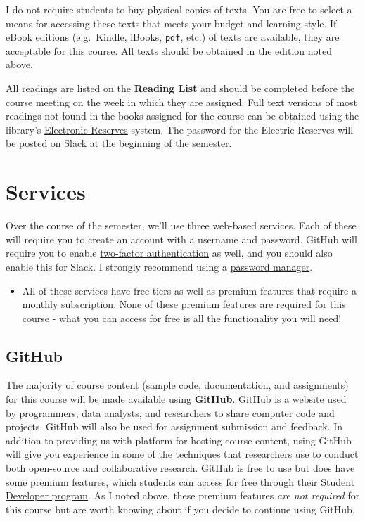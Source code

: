 \documentclass[]{book}
\newenvironment{rmdblock}[1]
  {\begin{shaded*}
  \begin{itemize}
  \renewcommand{\labelitemi}{
    \raisebox{-.7\height}[0pt][0pt]{
      {\setkeys{Gin}{width=3em,keepaspectratio}\texttt{[image: images/\#1]}}
    }
  }
  \item
  }
  {
  \end{itemize}
  \end{shaded*}
  }
\newenvironment{rmdwarning}
  {\begin{rmdblock}{warning}}
  {\end{rmdblock}}
\theoremstyle{definition}
\theoremstyle{definition}
\theoremstyle{definition}
\theoremstyle{remark}
\begin{document}
I do not require students to buy physical copies of texts. You are free
to select a means for accessing these texts that meets your budget and
learning style. If eBook editions (e.g.~Kindle, iBooks, \texttt{pdf},
etc.) of texts are available, they are acceptable for this course. All
texts should be obtained in the edition noted above.

All readings are listed on the \textbf{Reading List} and should be
completed before the course meeting on the week in which they are
assigned. Full text versions of most readings not found in the books
assigned for the course can be obtained using the library's
\href{http://eres.slu.edu/eres/coursepass.aspx?cid=4487}{Electronic
Reserves} system. The password for the Electric Reserves will be posted
on Slack at the beginning of the semester.

\hypertarget{services}{%
\section{Services}\label{services}}

Over the course of the semester, we'll use three web-based services.
Each of these will require you to create an account with a username and
password. GitHub will require you to enable
\href{https://en.wikipedia.org/wiki/Multi-factor_authentication}{two-factor
authentication} as well, and you should also enable this for Slack. I
strongly recommend using a
\href{https://lifehacker.com/5529133/five-best-password-managers}{password
manager}.

\begin{rmdwarning}
All of these services have free tiers as well as premium features that
require a monthly subscription. None of these premium features are
required for this course - what you can access for free is all the
functionality you will need!
\end{rmdwarning}

\hypertarget{github}{%
\subsection{GitHub}\label{github}}

The majority of course content (sample code, documentation, and
assignments) for this course will be made available using
\textbf{\href{http://www.github.com}{GitHub}}. GitHub is a website used
by programmers, data analysts, and researchers to share computer code
and projects. GitHub will also be used for assignment submission and
feedback. In addition to providing us with platform for hosting course
content, using GitHub will give you experience in some of the techniques
that researchers use to conduct both open-source and collaborative
research. GitHub is free to use but does have some premium features,
which students can access for free through their
\href{https://education.github.com/pack/}{Student Developer program}. As
I noted above, these premium features \emph{are not required} for this
course but are worth knowing about if you decide to continue using
GitHub.
\end{document}
